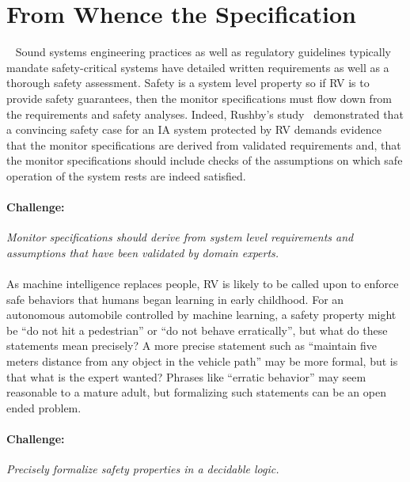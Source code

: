 \section{From Whence the Specification}~\label{sec:req} Sound systems
engineering practices as well as regulatory guidelines typically
mandate safety-critical systems have detailed written requirements as
well as a thorough safety assessment. Safety is a system level
property so if RV is to provide safety guarantees, then the monitor
specifications must flow down from the requirements and safety
analyses.  Indeed, Rushby's study~\cite{rvRushby,RushbyAIAA09}
demonstrated that a convincing safety case
for an IA system protected by RV demands evidence that the monitor
specifications are derived from validated requirements and,  that the monitor specifications should include checks of the
assumptions on which safe operation of the system rests are indeed
satisfied.

\paragraph{Challenge:} \emph{ Monitor specifications should derive from
  system level requirements and assumptions that have been validated
  by domain experts.} 


\paragraph{}  As
machine intelligence replaces people, RV is likely to be called upon
to enforce safe behaviors that humans began learning in early
childhood.  For an autonomous automobile controlled by machine
learning, a safety property might be ``do not hit a pedestrian'' or
``do not behave erratically'', but what do these statements mean
precisely?  A more precise statement such as ``maintain five meters
distance from any object in the vehicle path'' may be more formal, but
is that what is the expert wanted?  Phrases like ``erratic behavior''
may seem reasonable to a mature adult, but formalizing such statements
can be an open ended problem.

\paragraph{Challenge:} \emph{Precisely formalize safety properties  in
  a decidable logic.}


